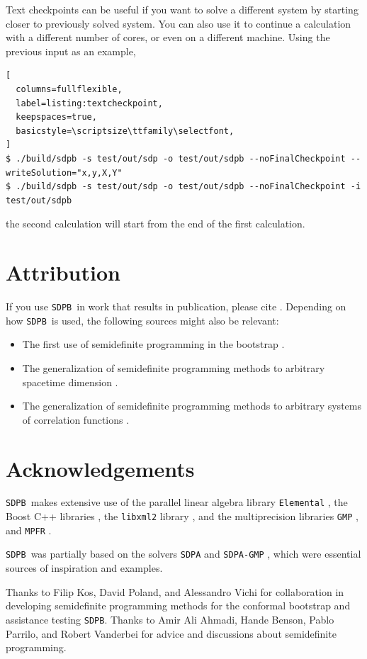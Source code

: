\documentclass[12pt]{article}
\numberwithin{equation}{section}
\newcommand\SDPB{\texttt{SDPB}}
\begin{document}
Text checkpoints can be useful if you want to solve a different system
by starting closer to previously solved system.  You can also use it
to continue a calculation with a different number of cores, or even on
a different machine.  Using the previous input as an example,

\begin{lstlisting}[
  columns=fullflexible,
  label=listing:textcheckpoint,
  keepspaces=true,
  basicstyle=\scriptsize\ttfamily\selectfont,
]
$ ./build/sdpb -s test/out/sdp -o test/out/sdpb --noFinalCheckpoint --writeSolution="x,y,X,Y"
$ ./build/sdpb -s test/out/sdp -o test/out/sdpb --noFinalCheckpoint -i test/out/sdpb
\end{lstlisting}
the second calculation will start from the end of the first calculation.

\section{Attribution}

If you use \SDPB\ in work that results in publication, please cite \cite{DSD}. Depending on how \SDPB\ is used, the following sources might also be relevant:
\begin{itemize}
\item The first use of semidefinite programming in the bootstrap \cite{Poland:2011ey}.
\item The generalization of semidefinite programming methods to arbitrary
spacetime dimension \cite{Kos:2013tga}.
\item The generalization of semidefinite programming methods to arbitrary
systems of correlation functions \cite{Kos:2014bka}.
\end{itemize}

\section{Acknowledgements}

\SDPB\ makes extensive use of the parallel linear algebra library
\texttt{Elemental} \cite{Elemental}, the Boost C++
libraries \cite{BoostSite}, the \texttt{libxml2} library
\cite{libxml2}, and the multiprecision libraries \texttt{GMP}
\cite{GMP}, and \texttt{MPFR}
\cite{MPFR}.

\SDPB\ was partially based on the solvers \texttt{SDPA} and
\texttt{SDPA-GMP} \cite{SDPA,SDPA2,SDPAGMP}, which were essential
sources of inspiration and examples.

Thanks to Filip Kos, David Poland, and Alessandro Vichi for collaboration in developing semidefinite programming methods for the conformal bootstrap and assistance testing \SDPB.  Thanks to Amir Ali Ahmadi, Hande Benson, Pablo Parrilo, and Robert Vanderbei for advice and discussions about semidefinite programming.
\end{document}

